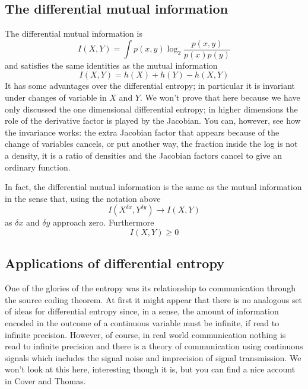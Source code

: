 \documentclass[12pt]{article}
\begin{document}
\subsection*{The differential mutual information}

The differential mutual information is
\begin{equation}
  I(X,Y)=\int p(x,y)\log_2{\frac{p(x,y)}{p(x)p(y)}}
\end{equation}
and satisfies the same identities as the mutual information
\begin{equation}
  I(X,Y)=h(X)+h(Y)-h(X,Y)
\end{equation}
It has some advantages over the differential entropy; in particular it
is invariant under changes of variable in $X$ and $Y$. We won't prove that here
because we have only discussed the one dimensional differential
entropy; in higher dimensions the role of the derivative factor is
played by the Jacobian.  You can, however, see how the invariance
works: the extra Jacobian factor that appears because of the change of
variables cancels, or put another way, the fraction inside the log is
not a density, it is a ratio of densities and the Jacobian factors
cancel to give an ordinary function.

In fact, the differential mutual information is the same as the mutual information in the sense that, using the notation above
\begin{equation}
  I(X^{\delta x},Y^{\delta y})\rightarrow I(X,Y)
\end{equation}
as $\delta x$ and $\delta y$ approach zero. Furthermore
\begin{equation}
  I(X,Y)\ge 0
\end{equation}


\subsection*{Applications of differential entropy}

One of the glories of the entropy was its relationship to
communication through the source coding theorem. At first it might
appear that there is no analogous set of ideas for differential
entropy since, in a sense, the amount of information encoded in the
outcome of a continuous variable must be infinite, if read to infinite
precision. However, of course, in real world communication nothing is
read to infinite precision and there is a theory of communication
using continuous signals which includes the signal noise and
imprecision of signal transmission. We won't look at this here,
interesting though it is, but you can find a nice account in Cover and
Thomas.
\end{document}
